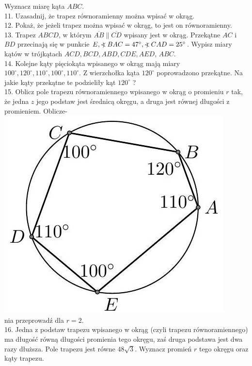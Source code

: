 \documentclass[10pt]{article}
\newcommand\Varangle{\mathop{{<\!\!\!\!\!\text{\small)}}\:}\nolimits}
\begin{document}
Wyznacz miarę kąta \(A B C\).\\
11. Uzasadnij, że trapez równoramienny można wpisać w okrąg.\\
12. Pokaż, że jeżeli trapez można wpisać w okrąg, to jest on równoramienny.\\
13. Trapez \(A B C D\), w którym \(\overline{A B} \| \overline{C D}\) wpisany jest w okrąg. Przekątne \(A C\) i \(B D\) przecinają się w punkcie \(E, \Varangle B A C=47^{\circ}, \Varangle C A D=25^{\circ}\). Wypisz miary kątów w trójkątach \(A C D, B C D, A B D, C D E, A E D\), \(A B C\).\\
14. Kolejne kąty pięciokąta wpisanego w okrąg mają miary \(100^{\circ}, 120^{\circ}, 110^{\circ}, 100^{\circ}, 110^{\circ}\). Z wierzchołka kąta \(120^{\circ}\) poprowadzono przekątne. Na jakie kąty przekątne te podzieliły kąt \(120^{\circ}\) ?\\
15. Oblicz pole trapezu równoramiennego wpisanego w okrąg o promieniu \(r\) tak, że jedna \(z\) jego podstaw jest średnicą okręgu, a druga jest równej długości z promieniem. Oblicze-\\
\includegraphics[max width=\textwidth, center]{2024_11_21_71f62bd117d375398909g-201}\\
nia przeprowadź dla \(r=2\).\\
16. Jedna z podstaw trapezu wpisanego w okrąg (czyli trapezu równoramiennego) ma długość równą długości promienia tego okręgu, zaś druga podstawa jest dwa razy dłuższa. Pole trapezu jest równe \(48 \sqrt{3}\). Wyznacz promień \(r\) tego okręgu oraz kąty trapezu.\\
\end{document}
